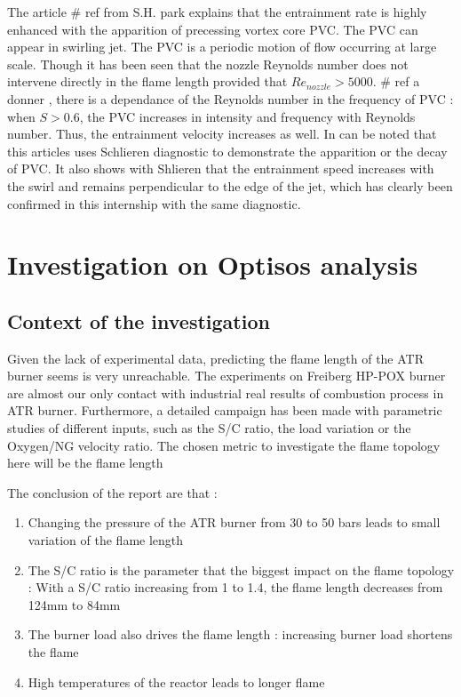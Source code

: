 The article \# ref from S.H. park explains that the entrainment rate is highly enhanced with the apparition of precessing vortex core PVC. The PVC can appear in swirling jet. The PVC is a periodic motion of flow occurring at large scale. Though it has been seen that the nozzle Reynolds number does not intervene directly in the flame length provided that $Re_{nozzle}>5000$. \# ref a donner , there is a dependance of the Reynolds number in the frequency of PVC : when $S>0.6$, the PVC increases in intensity and frequency with Reynolds number. Thus, the entrainment velocity increases as well. In can be noted that this articles uses Schlieren diagnostic to demonstrate the apparition or the decay of PVC. It also shows with Shlieren that the entrainment speed increases with the swirl and remains perpendicular to the edge of the jet, which has clearly been confirmed in this internship with the same diagnostic. 

\section{Investigation on Optisos analysis }

\subsection{Context of the investigation}

Given the lack of experimental data, predicting the flame length of the ATR burner seems is very unreachable. The experiments on Freiberg HP-POX burner are almost our only contact with industrial real results of combustion process in ATR burner. Furthermore, a detailed campaign has been made with parametric studies of different inputs, such as the S/C ratio, the load variation or the Oxygen/NG velocity ratio. The chosen metric to investigate the flame topology here will be the flame length 

The conclusion of the report are that :
\begin{enumerate}
\item Changing the pressure of the ATR burner from 30 to 50 bars leads to small variation of the flame length
\item The S/C ratio is the parameter that the biggest impact on the flame topology : With a S/C ratio increasing from 1 to 1.4, the flame length decreases from 124mm to 84mm
\item The burner load also drives the flame length : increasing burner load shortens the flame
\item High temperatures of the reactor leads to longer flame
\end{enumerate}

